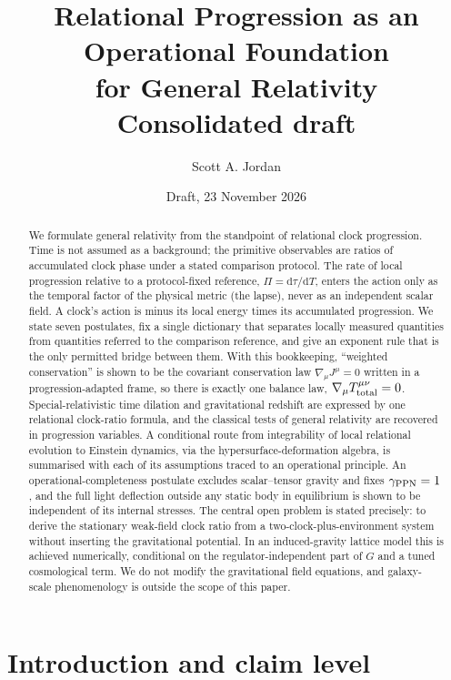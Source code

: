 \documentclass[11pt]{article}
\title{Relational Progression as an Operational Foundation\\ for General Relativity\\[4pt]
\large Consolidated draft}
\author{Scott A. Jordan}
\date{Draft, 23 November 2026}
\newcommand{\Pg}{\Pi}                 %
\newcommand{\dd}{\mathrm{d}}
\newcommand{\Tref}{T}                 %
\theoremstyle{plain}
\theoremstyle{definition}
\theoremstyle{remark}
\begin{document}
\maketitle

\begin{abstract}
We formulate general relativity from the standpoint of relational clock progression. Time is not assumed as a background; the primitive observables are ratios of accumulated clock phase under a stated comparison protocol. The rate of local progression relative to a protocol-fixed reference, $\Pg=\dd\tau/\dd\Tref$, enters the action only as the temporal factor of the physical metric (the lapse), never as an independent scalar field. A clock's action is minus its local energy times its accumulated progression. We state seven postulates, fix a single dictionary that separates locally measured quantities from quantities referred to the comparison reference, and give an exponent rule that is the only permitted bridge between them. With this bookkeeping, ``weighted conservation'' is shown to be the covariant conservation law $\nabla_\mu J^\mu=0$ written in a progression-adapted frame, so there is exactly one balance law, $\nabla_\mu T^{\mu\nu}_{\rm total}=0$. Special-relativistic time dilation and gravitational redshift are expressed by one relational clock-ratio formula, and the classical tests of general relativity are recovered in progression variables. A conditional route from integrability of local relational evolution to Einstein dynamics, via the hypersurface-deformation algebra, is summarised with each of its assumptions traced to an operational principle. An operational-completeness postulate excludes scalar--tensor gravity and fixes $\gamma_{\rm PPN}=1$, and the full light deflection outside any static body in equilibrium is shown to be independent of its internal stresses. The central open problem is stated precisely: to derive the stationary weak-field clock ratio from a two-clock-plus-environment system without inserting the gravitational potential. In an induced-gravity lattice model this is achieved numerically, conditional on the regulator-independent part of $G$ and a tuned cosmological term. We do not modify the gravitational field equations, and galaxy-scale phenomenology is outside the scope of this paper.
\end{abstract}

\tableofcontents

\section{Introduction and claim level}
\end{document}
